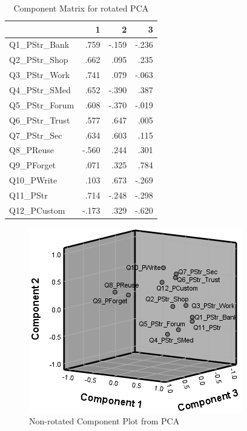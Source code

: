 \documentclass[letterpaper, 10 pt, conference]{ieeeconf}  %
\begin{document}
\begin{table}[h]
\caption{Component Matrix for rotated PCA}
\label{tab:compmatrixrot}
\begin{center}
\begin{tabular}{lrrr}
\hline
                & 1     & 2     & 3     \\ \hline
Q1\_PStr\_Bank  & .759  & -.159 & -.236 \\ \hline
Q2\_PStr\_Shop  & .662  & .095  & .235  \\ \hline
Q3\_PStr\_Work  & .741  & .079  & -.063 \\ \hline
Q4\_PStr\_SMed  & .652  & -.390 & .387  \\ \hline
Q5\_PStr\_Forum & .608  & -.370 & -.019 \\ \hline
Q6\_PStr\_Trust & .577  & .647  & .005  \\ \hline
Q7\_PStr\_Sec   & .634  & .603  & .115  \\ \hline
Q8\_PReuse      & -.560 & .244  & .301  \\ \hline
Q9\_PForget     & .071  & .325  & .784  \\ \hline
Q10\_PWrite     & .103  & .673  & -.269 \\ \hline
Q11\_PStr       & .714  & -.248 & -.298 \\ \hline
Q12\_PCustom    & -.173 & .329  & -.620 \\ \hline
\end{tabular}
\end{center}
\end{table}

\begin{figure}[thpb]
  \centering
    \includegraphics[scale=0.84]{compplot1.PNG}
  \caption{Non-rotated Component Plot from PCA}
  \label{fig:compplot}
\end{figure}
  
\end{document}
